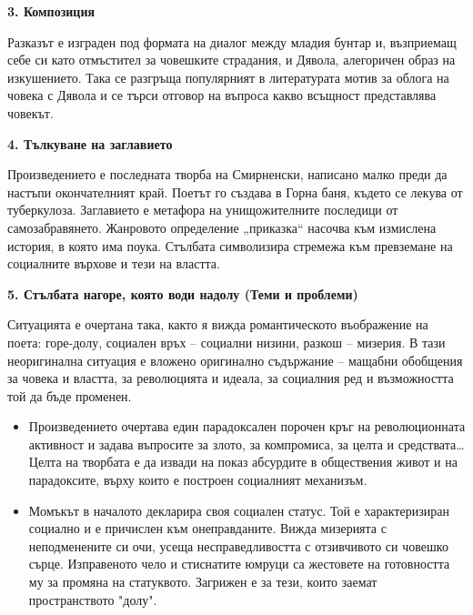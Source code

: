 \documentclass[12pt,a4paper]{article}
\begin{document}
\textbf{3. Композиция}
\vspace{0.1cm}
 
\indent Разказът е изграден под формата на диалог между младия бунтар и, възприемащ себе си като отмъстител за човешките страдания, и Дявола, алегоричен образ  на изкушението. Така се разгръща популярният в литературата мотив за облога на човека с Дявола и се търси отговор на въпроса какво всъщност представлява човекът.

\vspace{0.1cm}

\textbf{4. Тълкуване на заглавието}
\vspace{0.1cm}
 
\indent Произведението е последната творба на Смирненски, написано малко преди да настъпи окончателният край. Поетът го създава в Горна баня, където се лекува от туберкулоза. Заглавието е метафора на унищожителните последици от самозабравянето. Жанровото определение „приказка“ насочва към измислена история, в която има поука. Стълбата символизира стремежа към превземане на социалните върхове и тези на властта.

\vspace{0.1cm}

\textbf{5. Стълбата нагоре, която води надолу (Теми и проблеми)}
\vspace{0.1cm}
 
\indent Ситуацията е очертана така, както я вижда романтическото въображение на поета: горе-долу, социален връх – социални низини, разкош – мизерия. В тази неоригинална ситуация е вложено оригинално съдържание – мащабни обобщения за човека и властта, за революцията и идеала, за социалния ред и възможността той да бъде променен. 

\begin{itemize}[leftmargin=*]
\vspace{-0.2cm}
\item Произведението очертава един парадоксален порочен кръг на революционната активност и задава въпросите за злото, за компромиса, за целта и средствата… Целта на творбата е да извади на показ абсурдите в обществения живот и на парадоксите, върху които е построен социалният механизъм.
\end{itemize}

\begin{itemize}[leftmargin=*]
\vspace{-0.65cm}
\item Момъкът  в началото декларира своя социален статус. Той е характеризиран социално и е причислен към онеправданите. Вижда мизерията с неподменените си очи, усеща несправедливостта с отзивчивото си човешко сърце. Изправеното чело и стиснатите юмруци са жестовете на готовността му за промяна на статуквото. Загрижен е за тези, които заемат пространството "долу".
\end{itemize}
\end{document}
